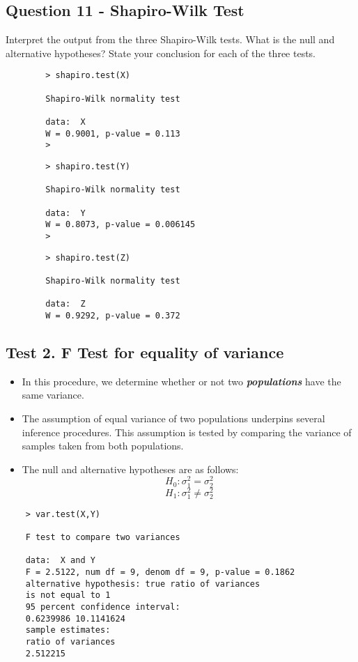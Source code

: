 \documentclass[]{report}
\begin{document}
	\subsection*{Question 11 - Shapiro-Wilk Test}
	Interpret the output from the three Shapiro-Wilk tests. What is the null and alternative hypotheses? State your conclusion for each of the three tests.
	\begin{framed}
		\begin{verbatim}
		> shapiro.test(X)
		
		Shapiro-Wilk normality test
		
		data:  X
		W = 0.9001, p-value = 0.113
		>
		\end{verbatim}
	\end{framed}
	\begin{framed}
		\begin{verbatim}
		> shapiro.test(Y)
		
		Shapiro-Wilk normality test
		
		data:  Y 
		W = 0.8073, p-value = 0.006145
		>
		\end{verbatim}
	\end{framed}
	\begin{framed}
		\begin{verbatim}
		> shapiro.test(Z)
		
		Shapiro-Wilk normality test
		
		data:  Z
		W = 0.9292, p-value = 0.372
		\end{verbatim}
	\end{framed}

\subsection*{Test 2. F Test for equality of variance}
\begin{itemize}
	\item In this procedure, we determine whether or not two \textit{\textbf{populations}} have the same variance.
	\item The assumption of equal variance of two populations underpins several inference procedures. This assumption is tested by comparing the variance of samples taken from both populations.
	\item The null and alternative hypotheses are as follows:
	\[ H_0: \sigma^2_1 = \sigma^2_2 \]
	\[ H_1: \sigma^2_1 \neq \sigma^2_2 \]
\end{itemize}
\begin{framed}
	\begin{verbatim}
	> var.test(X,Y)
	
	F test to compare two variances
	
	data:  X and Y
	F = 2.5122, num df = 9, denom df = 9, p-value = 0.1862
	alternative hypothesis: true ratio of variances
	is not equal to 1
	95 percent confidence interval:
	0.6239986 10.1141624
	sample estimates:
	ratio of variances 
	2.512215 
	\end{verbatim}
\end{framed}
\end{document}
